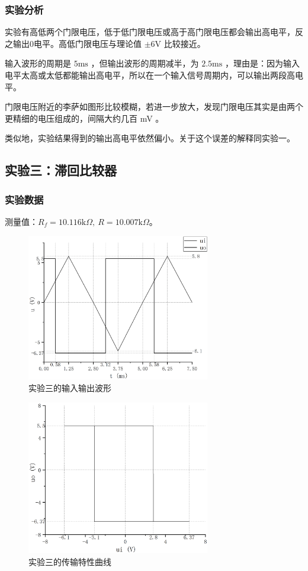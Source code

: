 \documentclass[a4paper,11pt,UTF8]{ctexart}
\newcommand\mr[1]{\mathrm{#1}}
\begin{document}
	\subsubsection{实验分析}
		实验有高低两个门限电压，低于低门限电压或高于高门限电压都会输出高电平，反之输出0电平。高低门限电压与理论值 $\pm6\mr{V}$ 比较接近。
		\par 输入波形的周期是 $5\mr{ms}$ ，但输出波形的周期减半，为 $2.5\mr{ms}$ ，理由是：因为输入电平太高或太低都能输出高电平，所以在一个输入信号周期内，可以输出两段高电平。
		\par 门限电压附近的李萨如图形比较模糊，若进一步放大，发现门限电压其实是由两个更精细的电压组成的，间隔大约几百 mV 。
		\par 类似地，实验结果得到的输出高电平依然偏小。关于这个误差的解释同实验一。
\subsection{实验三：滞回比较器}
	\subsubsection{实验数据}
		测量值：$R_f=10.116\mr{k}\Omega,~R=10.007\mr{k}\Omega$。
		\begin{figure}[H]
		 \centering
		 \includegraphics[width=8cm]{3-1}
		 \caption{实验三的输入输出波形}
		 \label{fig:3-1}
		\end{figure}
		\begin{figure}[H]
		 \centering
		 \includegraphics[width=8cm]{3-2}
		 \caption{实验三的传输特性曲线}
		 \label{fig:3-2}
		\end{figure}
\end{document}
